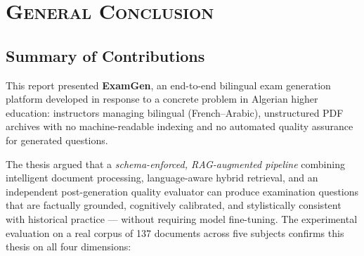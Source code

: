 \newpage
\section*{\textsc{General Conclusion}}
\lhead{}
\cfoot{\thepage}
\pagestyle{fancy}
\renewcommand{\headrulewidth}{0.4pt}

\subsection*{Summary of Contributions}

This report presented \textbf{ExamGen}, an end-to-end bilingual exam generation
platform developed in response to a concrete problem in Algerian higher education:
instructors managing bilingual (French--Arabic), unstructured PDF archives with no
machine-readable indexing and no automated quality assurance for generated questions.

The thesis argued that a \textit{schema-enforced, RAG-augmented pipeline} combining
intelligent document processing, language-aware hybrid retrieval, and an independent
post-generation quality evaluator can produce examination questions that are
factually grounded, cognitively calibrated, and stylistically consistent with
historical practice --- without requiring model fine-tuning.
The experimental evaluation on a real corpus of 137 documents across five subjects
confirms this thesis on all four dimensions:

